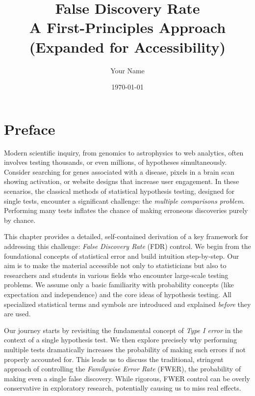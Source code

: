 \documentclass[12pt]{book}
\title{False Discovery Rate\\\vspace{0.4em}\large A First-Principles Approach\\\vspace{0.2em}\normalsize (Expanded for Accessibility)}
\author{Your Name}
\date{\today}
\newcommand{\FDR}{{FDR}}    %
\newcommand{\FWER}{{FWER}}  %
\begin{document}
\frontmatter
\maketitle
\tableofcontents
\listoffigures
\listoftables
\newpage

\chapter*{Preface}
Modern scientific inquiry, from genomics to astrophysics to web analytics, often involves testing thousands, or even millions, of hypotheses simultaneously. Consider searching for genes associated with a disease, pixels in a brain scan showing activation, or website designs that increase user engagement. In these scenarios, the classical methods of statistical hypothesis testing, designed for single tests, encounter a significant challenge: the \emph{multiple comparisons problem}. Performing many tests inflates the chance of making erroneous discoveries purely by chance.

This chapter provides a detailed, self-contained derivation of a key framework for addressing this challenge: \emph{False Discovery Rate} (\FDR) control. We begin from the foundational concepts of statistical error and build intuition step-by-step. Our aim is to make the material accessible not only to statisticians but also to researchers and students in various fields who encounter large-scale testing problems. We assume only a basic familiarity with probability concepts (like expectation and independence) and the core ideas of hypothesis testing. All specialized statistical terms and symbols are introduced and explained \emph{before} they are used.

\vspace{1em}
Our journey starts by revisiting the fundamental concept of \emph{Type I error} in the context of a single hypothesis test. We then explore precisely why performing multiple tests dramatically increases the probability of making such errors if not properly accounted for. This leads us to discuss the traditional, stringent approach of controlling the \emph{Familywise Error Rate} (\FWER), the probability of making even a single false discovery. While rigorous, FWER control can be overly conservative in exploratory research, potentially causing us to miss real effects.
\end{document}
